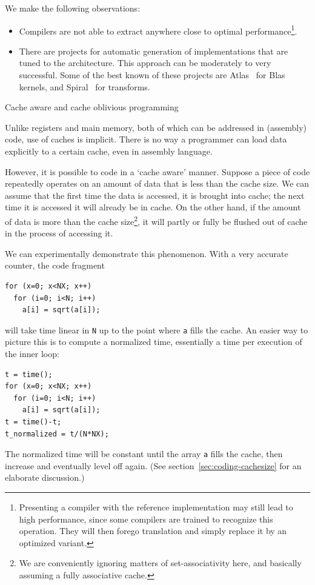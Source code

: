 We make the following observations:
\begin{itemize}
\item Compilers are not able to extract anywhere close
  to optimal performance\footnote{Presenting a compiler with the
    reference implementation may still lead to high performance, since
    some compilers are trained to recognize this operation. They will
    then forego translation and simply replace it by an optimized
    variant.}.
\item There are  projects for automatic
  generation of implementations that are tuned to the
  architecture. This approach can be moderately to very
  successful. Some of the best known of these projects are
  Atlas~\cite{atlas-parcomp} for Blas kernels, and
  Spiral~\cite{spiral} for transforms.
\end{itemize}

 {Cache aware and cache oblivious programming}

Unlike registers and main memory, both of
which can be addressed in (assembly) code, use of caches is
implicit. There is no way a programmer can load data explicitly to a
certain cache, even in assembly language. 

However, it is possible to code in a `cache aware' manner. Suppose a
piece of code repeatedly operates on an amount of data that is less
than the cache size. We can assume that the first time the data is
accessed, it is brought into cache; the next time it is accessed it
will already be in cache. On the other hand, if the amount of data is
more than the cache size\footnote{We are conveniently ignoring matters
  of set-associativity here, and basically assuming a fully
  associative cache.}, it will partly or fully be flushed out of cache
in the process of accessing it.

We can experimentally demonstrate this phenomenon. With a very
accurate counter, the code fragment
\begin{verbatim}
for (x=0; x<NX; x++)
  for (i=0; i<N; i++)
    a[i] = sqrt(a[i]);
\end{verbatim}
will take time linear in \texttt{N} up to the point where \texttt{a}
fills the cache. An easier way to picture this is to compute a
normalized time, essentially a time per execution of the inner loop:
\begin{verbatim}
t = time();
for (x=0; x<NX; x++)
  for (i=0; i<N; i++)
    a[i] = sqrt(a[i]);
t = time()-t;
t_normalized = t/(N*NX);
\end{verbatim}
The normalized time will be constant until the array \texttt{a} fills
the cache, then increase and eventually level off again. (See
section~\ref{sec:coding-cachesize} for an elaborate discussion.)

